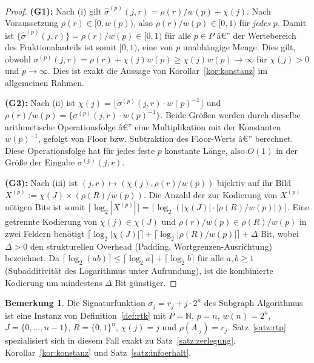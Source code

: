 ﻿\documentclass[a4paper,12pt]{article}
\theoremstyle{definition}
\newtheorem{bemerkung}{Bemerkung}
\begin{document}
\begin{proof}
	\textbf{(G1):} Nach (i) gilt $\hat\sigma^{(p)}(j,r) = \rho(r)/w(p) + \chi(j)$.
	Nach Voraussetzung $\rho(r)\in[0,w(p))$, also $\rho(r)/w(p)\in[0,1)$ für
	\emph{jedes} $p$. Damit ist $\{\hat\sigma^{(p)}(j,r)\} = \rho(r)/w(p)\in[0,1)$
	für alle $p\in P$ â€” der Wertebereich des Fraktionalanteils ist somit
	$[0,1)$, eine von $p$ unabhängige Menge. Dies gilt, obwohl
	$\sigma^{(p)}(j,r) = \rho(r)+\chi(j)w(p) \geq \chi(j)w(p) \to \infty$ für
	$\chi(j)>0$ und $p\to\infty$. Dies ist exakt die Aussage von
	Korollar~\ref{kor:konstanz} im allgemeinen Rahmen.

	\textbf{(G2):} Nach (ii) ist
	$\chi(j) = \lfloor \sigma^{(p)}(j,r)\cdot w(p)^{-1}\rfloor$ und
	$\rho(r)/w(p) = \{\sigma^{(p)}(j,r)\cdot w(p)^{-1}\}$. Beide Größen
	werden durch dieselbe arithmetische Operationsfolge â€” eine
	Multiplikation mit der Konstanten $w(p)^{-1}$, gefolgt von Floor bzw.
	Subtraktion des Floor-Werts â€” berechnet. Diese Operationsfolge hat für
	jedes feste $p$ konstante Länge, also $O(1)$ in der Größe der Eingabe
	$\sigma^{(p)}(j,r)$.

	\textbf{(G3):} Nach (iii) ist $(j,r)\mapsto(\chi(j),\rho(r)/w(p))$
	bijektiv auf ihr Bild $X^{(p)} := \chi(J)\times(\rho(R)/w(p))$. Die
	Anzahl der zur Kodierung von $X^{(p)}$ nötigen Bits ist somit
	$\lceil\log_2|X^{(p)}|\rceil = \lceil\log_2(|\chi(J)|\cdot|\rho(R)/w(p)|)\rceil$.
	Eine getrennte Kodierung von $\chi(j)\in\chi(J)$ und
	$\rho(r)/w(p)\in\rho(R)/w(p)$ in zwei Feldern benötigt
	$\lceil\log_2|\chi(J)|\rceil + \lceil\log_2|\rho(R)/w(p)|\rceil + \Delta$
	Bit, wobei $\Delta>0$ den strukturellen Overhead (Padding,
	Wortgrenzen-Ausrichtung) bezeichnet. Da
	$\lceil\log_2(ab)\rceil \leq \lceil\log_2 a\rceil + \lceil\log_2 b\rceil$
	für alle $a,b\geq1$ (Subadditivität des Logarithmus unter Aufrundung),
	ist die kombinierte Kodierung um mindestens $\Delta$ Bit günstiger.
	\qedhere
\end{proof}

\begin{bemerkung}
\label{bem:instanz}
	Die Signaturfunktion $\sigma_j = r_j + j\cdot 2^n$ des Subgraph
	Algorithmus ist eine Instanz von Definition~\ref{def:rtk} mit
	$P=\mathbb{N}$, $p=n$, $w(n)=2^n$, $J=\{0,\ldots,n-1\}$,
	$R=\{0,1\}^n$, $\chi(j)=j$ und $\rho(A_{\cdot j}) = r_j$. Satz~\ref{satz:rtp}
	spezialisiert sich in diesem Fall exakt zu
	Satz~\ref{satz:zerlegung}, Korollar~\ref{kor:konstanz} und
	Satz~\ref{satz:infoerhalt}.
\end{bemerkung}
\end{document}
